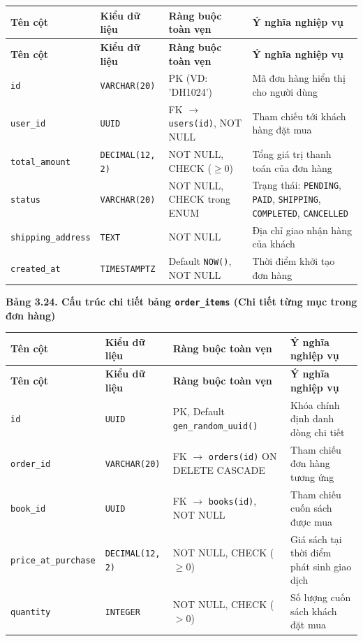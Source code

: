 \documentclass[11pt, a4paper]{report}
\begin{document}
\begin{longtable}{p{3.2cm} p{2.6cm} p{4.0cm} p{4.5cm}}
\toprule
\textbf{Tên cột} & \textbf{Kiểu dữ liệu} & \textbf{Ràng buộc toàn vẹn} & \textbf{Ý nghĩa nghiệp vụ} \\
\midrule
\endfirsthead
\toprule
\textbf{Tên cột} & \textbf{Kiểu dữ liệu} & \textbf{Ràng buộc toàn vẹn} & \textbf{Ý nghĩa nghiệp vụ} \\
\midrule
\endhead
\bottomrule
\endfoot
\texttt{id} & \texttt{VARCHAR(20)} & PK (VD: 'DH1024') & Mã đơn hàng hiển thị cho người dùng \\
\midrule
\texttt{user\_id} & \texttt{UUID} & FK $\rightarrow$ \texttt{users(id)}, NOT NULL & Tham chiếu tới khách hàng đặt mua \\
\midrule
\texttt{total\_amount} & \texttt{DECIMAL(12, 2)} & NOT NULL, CHECK ($\ge 0$) & Tổng giá trị thanh toán của đơn hàng \\
\midrule
\texttt{status} & \texttt{VARCHAR(20)} & NOT NULL, CHECK trong ENUM & Trạng thái: \texttt{PENDING}, \texttt{PAID}, \texttt{SHIPPING}, \texttt{COMPLETED}, \texttt{CANCELLED} \\
\midrule
\texttt{shipping\_address}& \texttt{TEXT} & NOT NULL & Địa chỉ giao nhận hàng của khách \\
\midrule
\texttt{created\_at} & \texttt{TIMESTAMPTZ} & Default \texttt{NOW()}, NOT NULL & Thời điểm khởi tạo đơn hàng \\
\bottomrule
\end{longtable}

\vspace{0.3cm}
\noindent\textbf{Bảng 3.24. Cấu trúc chi tiết bảng \texttt{order\_items} (Chi tiết từng mục trong đơn hàng)}

\begin{longtable}{p{3.2cm} p{2.6cm} p{4.0cm} p{4.5cm}}
\toprule
\textbf{Tên cột} & \textbf{Kiểu dữ liệu} & \textbf{Ràng buộc toàn vẹn} & \textbf{Ý nghĩa nghiệp vụ} \\
\midrule
\endfirsthead
\toprule
\textbf{Tên cột} & \textbf{Kiểu dữ liệu} & \textbf{Ràng buộc toàn vẹn} & \textbf{Ý nghĩa nghiệp vụ} \\
\midrule
\endhead
\bottomrule
\endfoot
\texttt{id} & \texttt{UUID} & PK, Default \texttt{gen\_random\_uuid()} & Khóa chính định danh dòng chi tiết \\
\midrule
\texttt{order\_id} & \texttt{VARCHAR(20)} & FK $\rightarrow$ \texttt{orders(id)} ON DELETE CASCADE & Tham chiếu đơn hàng tương ứng \\
\midrule
\texttt{book\_id} & \texttt{UUID} & FK $\rightarrow$ \texttt{books(id)}, NOT NULL & Tham chiếu cuốn sách được mua \\
\midrule
\texttt{price\_at\_purchase}& \texttt{DECIMAL(12, 2)}& NOT NULL, CHECK ($\ge 0$) & Giá sách tại thời điểm phát sinh giao dịch \\
\midrule
\texttt{quantity} & \texttt{INTEGER} & NOT NULL, CHECK ($> 0$) & Số lượng cuốn sách khách đặt mua \\
\bottomrule
\end{longtable}
\end{document}
